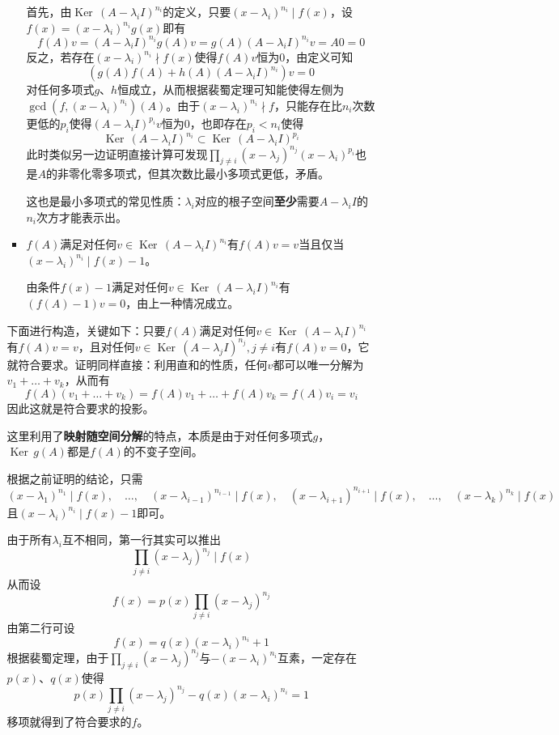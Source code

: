 \documentclass[a4paper,UTF8,fontset=windows,AutoFakeBold]{ctexart}
\DeclareMathOperator{\Ker}{Ker\,}
\newcommand*{\note}{\noindent *}
\begin{document}
\begin{enumerate}
\begin{enumerate}
\begin{itemize}
            首先，由$\Ker(A-\lambda_iI)^{n_i}$的定义，只要$(x-\lambda_i)^{n_i}\mid f(x)$，设$f(x)=(x-\lambda_i)^{n_i}g(x)$即有
            $$f(A)v=(A-\lambda_iI)^{n_i}g(A)v=g(A)(A-\lambda_iI)^{n_i}v=A0=0$$
            反之，若存在$(x-\lambda_i)^{n_i}\nmid f(x)$使得$f(A)v$恒为0，由定义可知
            $$(g(A)f(A)+h(A)(A-\lambda_iI)^{n_i})v=0$$
            对任何多项式$g$、$h$恒成立，从而根据裴蜀定理可知能使得左侧为$\gcd(f,(x-\lambda_i)^{n_i})(A)$。由于$(x-\lambda_i)^{n_i}\nmid f$，只能存在比$n_i$次数更低的$p_i$使得$(A-\lambda_iI)^{p_i}v$恒为0，也即存在$p_i<n_i$使得
            $$\Ker(A-\lambda_iI)^{n_i}\subset\Ker(A-\lambda_iI)^{p_i}$$
            此时类似另一边证明直接计算可发现$\prod_{j\ne i}(x-\lambda_j)^{n_j}(x-\lambda_i)^{p_i}$也是$A$的非零化零多项式，但其次数比最小多项式更低，矛盾。

            \note 这也是最小多项式的常见性质：$\lambda_i$对应的根子空间\textbf{至少}需要$A-\lambda_iI$的$n_i$次方才能表示出。

            \item $f(A)$满足对任何$v\in\Ker(A-\lambda_iI)^{n_i}$有$f(A)v=v$当且仅当$(x-\lambda_i)^{n_i}\mid f(x)-1$。
            
            由条件$f(x)-1$满足对任何$v\in\Ker(A-\lambda_iI)^{n_i}$有$(f(A)-1)v=0$，由上一种情况成立。
        \end{itemize}

        下面进行构造，关键如下：只要$f(A)$满足对任何$v\in\Ker(A-\lambda_iI)^{n_i}$有$f(A)v=v$，且对任何$v\in\Ker(A-\lambda_jI)^{n_j},j\ne i$有$f(A)v=0$，它就符合要求。证明同样直接：利用直和的性质，任何$v$都可以唯一分解为$v_1+\dots+v_k$，从而有
        $$f(A)(v_1+\dots+v_k)=f(A)v_1+\dots+f(A)v_k=f(A)v_i=v_i$$
        因此这就是符合要求的投影。

        \note 这里利用了\textbf{映射随空间分解}的特点，本质是由于对任何多项式$g$，$\Ker g(A)$都是$f(A)$的不变子空间。

        根据之前证明的结论，只需
        $$(x-\lambda_1)^{n_1}\mid f(x),\quad\dots,\quad(x-\lambda_{i-1})^{n_{i-1}}\mid f(x),\quad(x-\lambda_{i+1})^{n_{i+1}}\mid f(x),\quad\dots,\quad(x-\lambda_k)^{n_k}\mid f(x)$$
        且$(x-\lambda_i)^{n_i}\mid f(x)-1$即可。

        由于所有$\lambda_i$互不相同，第一行其实可以推出
        $$\prod_{j\ne i}(x-\lambda_j)^{n_j}\mid f(x)$$
        从而设
        $$f(x)=p(x)\prod_{j\ne i}(x-\lambda_j)^{n_j}$$
        由第二行可设
        $$f(x)=q(x)(x-\lambda_i)^{n_i}+1$$
        根据裴蜀定理，由于$\prod_{j\ne i}(x-\lambda_j)^{n_j}$与$-(x-\lambda_i)^{n_i}$互素，一定存在$p(x)$、$q(x)$使得
        $$p(x)\prod_{j\ne i}(x-\lambda_j)^{n_j}-q(x)(x-\lambda_i)^{n_i}=1$$
        移项就得到了符合要求的$f$。


\end{enumerate}
\end{enumerate}
\end{document}
